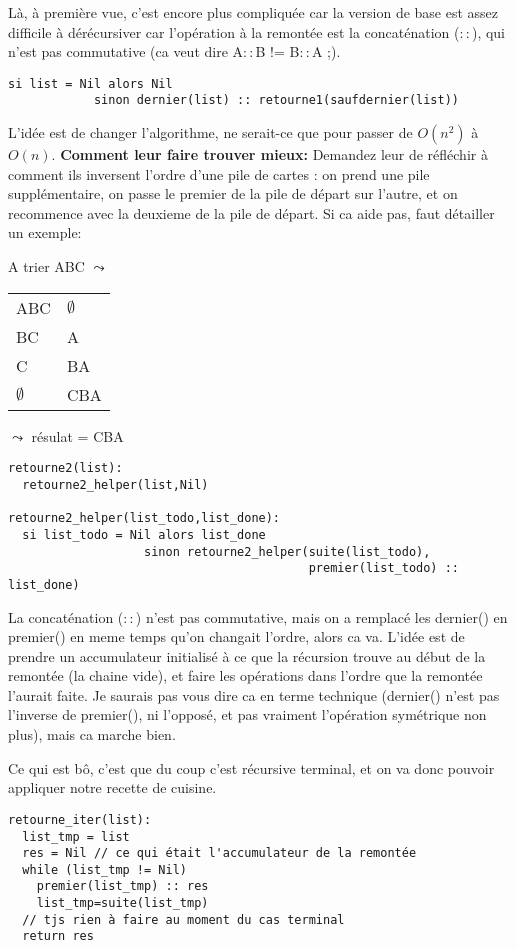 \documentclass[10pt]{article}\usepackage[correction]{esial}
\begin{document}
\begin{Reponse}
  Là, à première vue, c'est encore plus compliquée car la version de base est
  assez difficile à dérécursiver car l'opération à la remontée est la
  concaténation ($::$), qui
  n'est pas commutative (ca veut dire A$::$B != B$::$A ;).
  \begin{Verbatim}[label=retourne(list) -- version bourinne]
si list = Nil alors Nil
            sinon dernier(list) :: retourne1(saufdernier(list))
  \end{Verbatim}

  L'idée est de changer l'algorithme, ne serait-ce que pour passer de $O(n^2)$
  à $O(n)$. \textbf{Comment leur faire trouver mieux:} Demandez leur de
  réfléchir à comment ils inversent l'ordre d'une pile de cartes : on prend une
  pile supplémentaire, on passe le premier de la pile de départ sur l'autre, et
  on recommence avec la deuxieme de la pile de départ. Si ca aide pas, faut
  détailler un exemple:

  A trier ABC $\leadsto$ \begin{tabular}{|l l|}\hline
    ABC&$\emptyset$\\
    BC&A\\
    C&BA\\
    $\emptyset$&CBA\\\hline
  \end{tabular}$\leadsto$ résulat = CBA

  \begin{Verbatim}[label=retourne(list) -- avec helper]
retourne2(list):
  retourne2_helper(list,Nil)

retourne2_helper(list_todo,list_done):
  si list_todo = Nil alors list_done
                   sinon retourne2_helper(suite(list_todo),
                                          premier(list_todo) :: list_done)
  \end{Verbatim}
  La concaténation ($::$) n'est pas commutative, mais on a remplacé les
  dernier() en premier() en meme temps qu'on changait l'ordre, alors ca va.
  L'idée est de prendre un accumulateur initialisé à ce que la récursion trouve
  au début de la remontée (la chaine vide), et faire les opérations dans l'ordre
  que la remontée l'aurait faite.  Je saurais pas vous dire ca en terme
  technique (dernier() n'est pas l'inverse de premier(), ni l'opposé, et pas
  vraiment l'opération symétrique non plus), mais ca marche bien.

  Ce qui est bô, c'est que du coup c'est récursive terminal, et on va donc
  pouvoir appliquer notre recette de cuisine.

  \begin{Verbatim}[label=retourne(list) -- itérative]
retourne_iter(list):
  list_tmp = list
  res = Nil // ce qui était l'accumulateur de la remontée
  while (list_tmp != Nil)
    premier(list_tmp) :: res
    list_tmp=suite(list_tmp)
  // tjs rien à faire au moment du cas terminal
  return res
  \end{Verbatim}

\end{Reponse}
\end{document}
